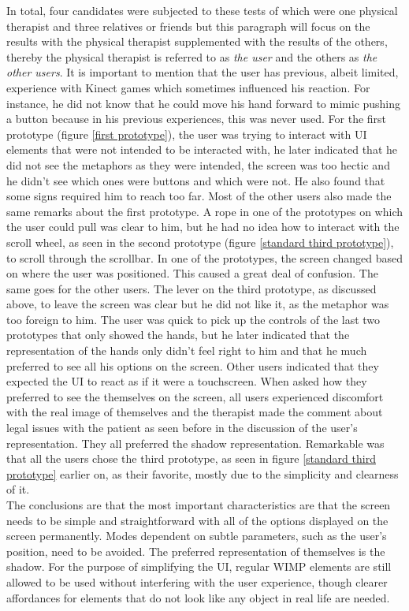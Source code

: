 In total, four candidates were subjected to these tests of which were one physical therapist and three relatives or friends but this paragraph will focus on the results with the physical therapist supplemented with the results of the others, thereby the physical therapist is referred to as \emph{the user} and the others as \emph{the other users}. It is important to mention that the user has previous, albeit limited, experience with Kinect games which sometimes influenced his reaction. For instance, he did not know that he could move his hand forward to mimic pushing a button because in his previous experiences, this was never used. For the first prototype (figure \ref{first prototype}), the user was trying to interact with UI elements that were not intended to be interacted with, he later indicated that he did not see the metaphors as they were intended, the screen was too hectic and he didn't see which ones were buttons and which were not. He also found that some signs required him to reach too far. Most of the other users also made the same remarks about the first prototype. A rope in one of the prototypes on which the user could pull was clear to him, but he had no idea how to interact with the scroll wheel, as seen in the second prototype (figure \ref{standard third prototype}), to scroll through the scrollbar. In one of the prototypes, the screen changed based on where the user was positioned. This caused a great deal of confusion. The same goes for the other users. The lever on the third prototype, as discussed above, to leave the screen was clear but he did not like it, as the metaphor was too foreign to him. The user was quick to pick up the controls of the last two prototypes that only showed the hands, but he later indicated that the representation of the hands only didn't feel right to him and that he much preferred to see all his options on the screen. Other users indicated that they expected the UI to react as if it were a touchscreen. When asked how they preferred to see the themselves on the screen, all users experienced discomfort with the real image of themselves and the therapist made the comment about legal issues with the patient as seen before in the discussion of the user's representation. They all preferred the shadow representation.  Remarkable was that all the users chose the third prototype, as seen in figure \ref{standard third prototype} earlier on, as their favorite, mostly due to the simplicity and clearness of it.\\

The conclusions are that the most important characteristics are that the screen needs to be simple and straightforward with all of the options displayed on the screen permanently. Modes dependent on subtle parameters, such as the user's position, need to be avoided. The preferred representation of themselves is the shadow. For the purpose of simplifying the UI, regular WIMP elements are still allowed to be used without interfering with the user experience, though clearer affordances for elements that do not look like any object in real life are needed.\\


